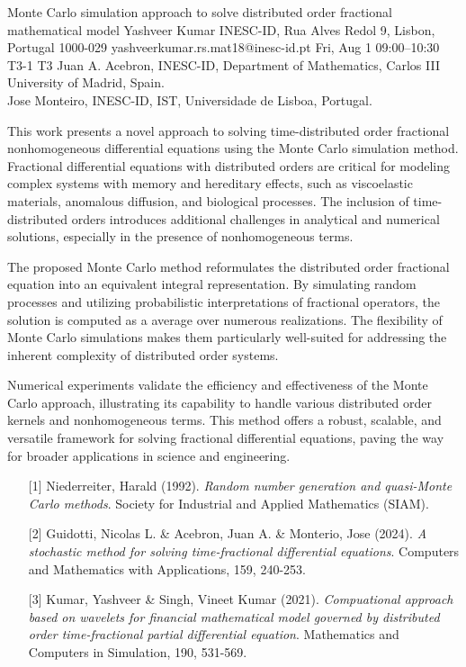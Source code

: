 \begin{talk}
  {Monte Carlo simulation approach to solve distributed order fractional mathematical model}%
  {Yashveer Kumar}%
  {INESC-ID, Rua Alves Redol 9, Lisbon, Portugal 1000-029}%
  {yashveerkumar.rs.mat18@inesc-id.pt}%
  {}%
  {}%
  {Fri, Aug 1 09:00–10:30}%
  {T3-1}%
  {T3}%
  {Juan A. Acebron, INESC-ID,  Department of Mathematics, Carlos III University of Madrid, Spain.\\
  	Jose Monteiro, INESC-ID, IST, Universidade de Lisboa, Portugal.}%
				
			
			
This work presents a novel approach to solving time-distributed order fractional nonhomogeneous differential equations using the Monte Carlo simulation method. Fractional differential equations with distributed orders are critical for modeling complex systems with memory and hereditary effects, such as viscoelastic materials, anomalous diffusion, and biological processes. The inclusion of time-distributed orders introduces additional challenges in analytical and numerical solutions, especially in the presence of nonhomogeneous terms.

The proposed Monte Carlo method reformulates the distributed order fractional equation into an equivalent integral representation. By simulating random processes and utilizing probabilistic interpretations of fractional operators, the solution is computed as a average over numerous realizations. The flexibility of Monte Carlo simulations makes them particularly well-suited for addressing the inherent complexity of distributed order systems.

Numerical experiments validate the efficiency and effectiveness of the Monte Carlo approach, illustrating its capability to handle various distributed order kernels and nonhomogeneous terms. This method offers a robust, scalable, and versatile framework for solving fractional differential equations, paving the way for broader applications in science and engineering.

\medskip
\begin{enumerate}
	\item[{[1]}] Niederreiter, Harald (1992). {\it Random number generation and quasi-Monte Carlo methods}. Society for Industrial and Applied Mathematics (SIAM).
	\item[{[2]}] Guidotti, Nicolas L. \& Acebron, Juan A.  \&  Monterio, Jose (2024). {\it A stochastic method for solving time-fractional differential equations}. Computers and Mathematics with Applications, 159, 240-253.
	\item[{[3]}] Kumar, Yashveer \& Singh, Vineet Kumar (2021). {\it Compuational approach based on wavelets for financial mathematical model governed by distributed order time-fractional partial differential equation}. Mathematics and Computers in Simulation, 190, 531-569.
\end{enumerate}
\end{talk}

